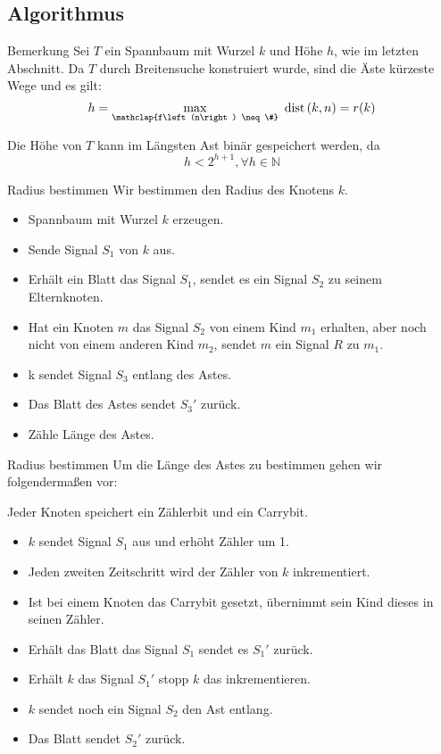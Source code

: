 \documentclass[18pt]{beamer}
\begin{document}
\subsection{Algorithmus}
\begin{frame}
	\begin{exampleblock}{Bemerkung}
		Sei $T$ ein Spannbaum mit Wurzel $k$ und Höhe $h$, wie im letzten Abschnitt. Da $T$ durch Breitensuche konstruiert wurde, sind die Äste kürzeste Wege und es gilt:
		\begin{displaymath}
			h = \max_{\mathclap{f\left(n\right) \neq \#}} \text{ dist}\left(k, n\right) = r(k)
		\end{displaymath}
		
		Die Höhe von $T$ kann im Längsten Ast binär gespeichert werden, da
		\begin{displaymath}
			h < 2^{h + 1} , \forall h \in \mathbb{N}
		\end{displaymath}
	\end{exampleblock}
\end{frame}

\begin{frame}{Radius bestimmen}
	Wir bestimmen den Radius des Knotens $k$.
	\begin{itemize}
		\item Spannbaum mit Wurzel $k$ erzeugen.
		\item Sende Signal $S_1$ von $k$ aus.
		\item Erhält ein Blatt das Signal $S_1$, sendet es ein Signal $S_2$ zu seinem Elternknoten.
		\item Hat ein Knoten $m$ das Signal $S_2$ von einem Kind $m_1$ erhalten, aber noch nicht von einem anderen Kind $m_2$, sendet $m$ ein Signal $R$ zu $m_1$.
		\item k sendet Signal $S_3$ entlang des Astes.
		\item Das Blatt des Astes sendet $S_3'$ zurück.
		\item Zähle Länge des Astes. 
	\end{itemize}
\end{frame}

\begin{frame}{Radius bestimmen}
	Um die Länge des Astes zu bestimmen gehen wir folgendermaßen vor:
	
	Jeder Knoten speichert ein Zählerbit und ein Carrybit.
	\begin{itemize}
		\item $k$ sendet Signal $S_1$ aus und erhöht Zähler um 1. 
		\item Jeden zweiten Zeitschritt wird der Zähler von $k$ inkrementiert.
		\item Ist bei einem Knoten das Carrybit gesetzt, übernimmt sein Kind dieses in seinen Zähler.
		\item Erhält das Blatt das Signal $S_1$ sendet es $S_1'$ zurück.
		\item Erhält $k$ das Signal $S_1'$ stopp $k$ das inkrementieren.
		\item $k$ sendet noch ein Signal $S_2$ den Ast entlang.
		\item Das Blatt sendet $S_2'$ zurück.
	\end{itemize}
\end{frame}
\end{document}
